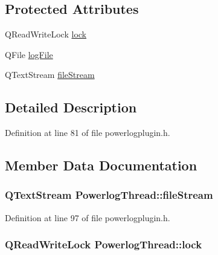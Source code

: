 \subsection*{Protected Attributes}
\begin{DoxyCompactItemize}
\item 
Q\-Read\-Write\-Lock \hyperlink{class_powerlog_thread_a365d62f374a4aa61f14a3a505fd76414}{lock}
\item 
Q\-File \hyperlink{class_powerlog_thread_a62efcac44703411ff9cf47f57a7f1b86}{log\-File}
\item 
Q\-Text\-Stream \hyperlink{class_powerlog_thread_a3c63539ac0a8a7b720cfb346591a1a7a}{file\-Stream}
\end{DoxyCompactItemize}


\subsection{Detailed Description}


Definition at line 81 of file powerlogplugin.\-h.



\subsection{Member Data Documentation}
\hypertarget{class_powerlog_thread_a3c63539ac0a8a7b720cfb346591a1a7a}{
\subsubsection[{file\-Stream}]{\setlength{\rightskip}{0pt plus 5cm}Q\-Text\-Stream Powerlog\-Thread\-::file\-Stream\hspace{0.3cm}{\ttfamily [protected]}}}\label{class_powerlog_thread_a3c63539ac0a8a7b720cfb346591a1a7a}


Definition at line 97 of file powerlogplugin.\-h.

\hypertarget{class_powerlog_thread_a365d62f374a4aa61f14a3a505fd76414}{
\subsubsection[{lock}]{\setlength{\rightskip}{0pt plus 5cm}Q\-Read\-Write\-Lock Powerlog\-Thread\-::lock\hspace{0.3cm}{\ttfamily [protected]}}}\label{class_powerlog_thread_a365d62f374a4aa61f14a3a505fd76414}


